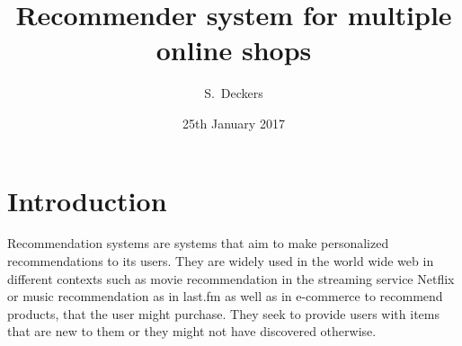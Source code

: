 \documentclass[10pt]{reportMaster}
\title{Recommender system for multiple online shops}
\author{S.\ Deckers}
\date{25th January 2017}
\begin{document}
\maketitle

\tableofcontents

\listoffigures
\listoftables
\listofalgorithms

\chapter{Introduction}
Recommendation systems are systems that aim to make personalized recommendations to its users.
They are widely used in the world wide web in different contexts such as movie recommendation in the streaming service Netflix or music recommendation as in last.fm as well as in e-commerce to recommend products, that the user might purchase.
They seek to provide users with items that are new to them or they might not have discovered otherwise.
\end{document}
